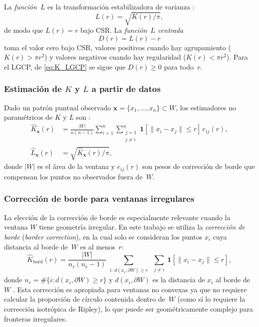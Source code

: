 \documentclass[a4paper,fleqn]{cas-sc}
\numberwithin{equation}{section}
\begin{document}
La \emph{funci\'on~$L$} es la transformaci\'on estabilizadora de varianza
\citep{Besag1977}:
\begin{equation}
    L(r) = \sqrt{K(r)/\pi},
    \label{eq:L_function}
\end{equation}
de modo que $L(r)=r$ bajo CSR. La \emph{funci\'on~$L$ centrada}
\begin{equation}
    D(r) = L(r) - r
    \label{eq:D_function_theory}
\end{equation}
toma el valor cero bajo CSR, valores positivos cuando hay agrupamiento
($K(r)>\pi r^2$) y valores negativos cuando hay regularidad
($K(r)<\pi r^2$). Para el LGCP, de \eqref{eq:K_LGCP} se sigue que
$D(r)\geq 0$ para todo~$r$.

\subsubsection{Estimaci\'on de $K$ y $L$ a partir de datos}

Dado un patr\'on puntual observado $\mathbf{x}=\{x_1,\ldots,x_n\}\subset W$,
los estimadores no param\'etricos de $K$ y $L$ son
\citep{Ripley88, spatstat}:
\begin{align}
    \widehat{K}_{\mathbf{x}}(r) &= \frac{|W|}{n(n-1)}\sum_{i=1}^{n}
    \sum_{\substack{j=1\\j\neq i}}^{n}
    \mathbf{1}[\|x_i-x_j\|\leq r]\,e_{ij}(r),
    \label{eq:K_hat} \\
    \widehat{L}_{\mathbf{x}}(r) &= \sqrt{\widehat{K}_{\mathbf{x}}(r)/\pi},
    \label{eq:L_hat}
\end{align}
donde $|W|$ es el \'area de la ventana y $e_{ij}(r)$ son pesos de correcci\'on
de borde que compensan los puntos no observados fuera de~$W$.

\subsubsection{Correcci\'on de borde para ventanas irregulares}

La elecci\'on de la correcci\'on de borde es especialmente relevante cuando la
ventana $W$ tiene geometr\'ia irregular. En este trabajo se utiliza la
\emph{correcci\'on de borde} (\textit{border correction}), en la cual solo se
consideran los puntos $x_i$ cuya distancia al borde de~$W$ es al menos~$r$:
\begin{equation}
    \widehat{K}_{\mathrm{bord}}(r) = \frac{|W|}{n_r(n_r-1)}
    \sum_{\substack{i:\,d(x_i,\partial W)\geq r}}
    \sum_{\substack{j\neq i}}
    \mathbf{1}[\|x_i-x_j\|\leq r],
    \label{eq:K_border}
\end{equation}
donde $n_r = \#\{i : d(x_i,\partial W)\geq r\}$ y $d(x_i,\partial W)$ es la
distancia de $x_i$ al borde de~$W$ \citep{spatstat}. Esta correcci\'on es
apropiada para ventanas no convexas ya que no requiere calcular la proporci\'on
de c\'irculo contenida dentro de~$W$ (como s\'i lo requiere la correcci\'on
isotr\'opica de Ripley), lo que puede ser geom\'etricamente complejo para
fronteras irregulares.
\end{document}
